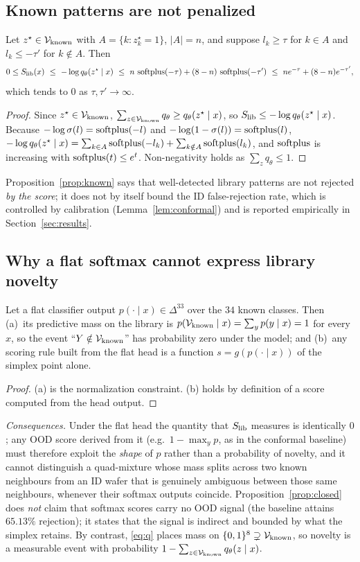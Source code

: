\subsection{Known patterns are not penalized}
\begin{proposition}\label{prop:known}
Let $z^\star\in\mathcal{V}_{\mathrm{known}}$ with $A=\{k:z^\star_k=1\}$, $|A|=n$, and suppose $l_k\ge\tau$ for $k\in A$ and
$l_k\le-\tau'$ for $k\notin A$. Then
\[
0\le\Slib(x)\ \le\ -\log q_\theta(z^\star\mid x)\ \le\ n\,\softplus(-\tau)+(8-n)\,\softplus(-\tau')\ \le\ n e^{-\tau}+(8-n)e^{-\tau'} ,
\]
which tends to $0$ as $\tau,\tau'\to\infty$.
\end{proposition}
\begin{proof}
Since $z^\star\in\mathcal{V}_{\mathrm{known}}$, $\sum_{z\in\mathcal{V}_{\mathrm{known}}}q_\theta\ge q_\theta(z^\star\mid x)$, so $S_{\mathrm{lib}}\le-\log q_\theta(z^\star\mid x)$.
Because $-\log\sigma(l)=\operatorname{softplus}(-l)$ and $-\log(1-\sigma(l))=\operatorname{softplus}(l)$,
$-\log q_\theta(z^\star\mid x)=\sum_{k\in A}\operatorname{softplus}(-l_k)+\sum_{k\notin A}\operatorname{softplus}(l_k)$, and $\operatorname{softplus}$ is
increasing with $\operatorname{softplus}(t)\le e^{t}$. Non-negativity holds as $\sum_z q_\theta\le1$.
\end{proof}
Proposition~\ref{prop:known} says that well-detected library patterns are not rejected
\emph{by the score}; it does not by itself bound the ID false-rejection rate, which is controlled
by calibration (Lemma~\ref{lem:conformal}) and is reported empirically in Section~\ref{sec:results}.

\subsection{Why a flat softmax cannot express library novelty}
\begin{proposition}\label{prop:closed}
Let a flat classifier output $p(\cdot\mid x)\in\Delta^{33}$ over the $34$ known classes. Then
(a)~its predictive mass on the library is $p(\mathcal{V}_{\mathrm{known}}\mid x)=\sum_{y}p(y\mid x)=1$ for every $x$, so the
event ``$Y\notin\mathcal{V}_{\mathrm{known}}$'' has probability zero under the model; and (b)~any scoring rule built
from the flat head is a function $s=g(p(\cdot\mid x))$ of the simplex point alone.
\end{proposition}
\begin{proof}
(a) is the normalization constraint. (b) holds by definition of a score computed from the head output.
\end{proof}
\noindent\emph{Consequences.} Under the flat head the quantity that $S_{\mathrm{lib}}$ measures is identically
$0$; any OOD score derived from it (e.g.\ $1-\max_y p$, as in the conformal baseline) must
therefore exploit the \emph{shape} of $p$ rather than a probability of novelty, and it cannot distinguish a
quad-mixture whose mass splits across two known neighbours from an ID wafer that is genuinely
ambiguous between those same neighbours, whenever their softmax outputs coincide.
Proposition~\ref{prop:closed} does \emph{not} claim that softmax scores carry no OOD signal
(the baseline attains $65.13\%$ rejection); it states that the signal is indirect and bounded by what the
simplex retains. By contrast, \eqref{eq:q} places mass on $\{0,1\}^8\supsetneq\mathcal{V}_{\mathrm{known}}$, so
novelty is a measurable event with probability $1-\sum_{z\in\mathcal{V}_{\mathrm{known}}}q_\theta(z\mid x)$.

